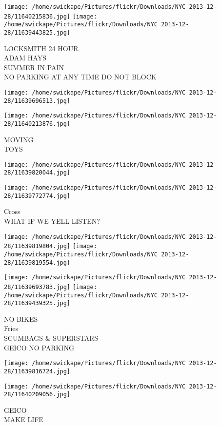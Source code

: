 \documentclass[10pt,letterpaper]{article}
\begin{document}
\texttt{[image: /home/swickape/Pictures/flickr/Downloads/NYC 2013-12-28/11640215836.jpg]}
\texttt{[image: /home/swickape/Pictures/flickr/Downloads/NYC 2013-12-28/11639443825.jpg]}

LOCKSMITH 24 HOUR\\
ADAM HAYS\\
SUMMER IN PAIN\\
NO PARKING AT ANY TIME DO NOT BLOCK
\pagebreak

\texttt{[image: /home/swickape/Pictures/flickr/Downloads/NYC 2013-12-28/11639696513.jpg]}

\vspace{0.25in}
\texttt{[image: /home/swickape/Pictures/flickr/Downloads/NYC 2013-12-28/11640213876.jpg]}

MOVING\\
TOYS
\pagebreak

\texttt{[image: /home/swickape/Pictures/flickr/Downloads/NYC 2013-12-28/11639820044.jpg]}

\vspace{0.25in}
\texttt{[image: /home/swickape/Pictures/flickr/Downloads/NYC 2013-12-28/11639772774.jpg]}

Cross\\
WHAT IF WE YELL LISTEN?
\pagebreak

\texttt{[image: /home/swickape/Pictures/flickr/Downloads/NYC 2013-12-28/11639819804.jpg]}
\texttt{[image: /home/swickape/Pictures/flickr/Downloads/NYC 2013-12-28/11639819554.jpg]}

\texttt{[image: /home/swickape/Pictures/flickr/Downloads/NYC 2013-12-28/11639693783.jpg]}
\texttt{[image: /home/swickape/Pictures/flickr/Downloads/NYC 2013-12-28/11639439325.jpg]}

NO BIKES\\
Fries\\
SCUMBAGS \& SUPERSTARS\\
GEICO NO PARKING
\pagebreak

\texttt{[image: /home/swickape/Pictures/flickr/Downloads/NYC 2013-12-28/11639816724.jpg]}

\vspace{0.25in}
\texttt{[image: /home/swickape/Pictures/flickr/Downloads/NYC 2013-12-28/11640209056.jpg]}

GEICO\\
MAKE LIFE
\pagebreak
\end{document}
